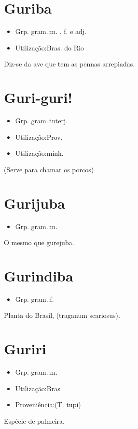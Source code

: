 \section{Guriba}
\begin{itemize}
\item {Grp. gram.:m. ,  f.  e  adj.}
\end{itemize}
\begin{itemize}
\item {Utilização:Bras. do Rio}
\end{itemize}
Diz-se da ave que tem as pennas arrepiadas.
\section{Guri-guri!}
\begin{itemize}
\item {Grp. gram.:interj.}
\end{itemize}
\begin{itemize}
\item {Utilização:Prov.}
\end{itemize}
\begin{itemize}
\item {Utilização:minh.}
\end{itemize}
(Serve para chamar os porcos)
\section{Gurijuba}
\begin{itemize}
\item {Grp. gram.:m.}
\end{itemize}
O mesmo que \textunderscore gurejuba\textunderscore .
\section{Gurindiba}
\begin{itemize}
\item {Grp. gram.:f.}
\end{itemize}
Planta do Brasil, (\textunderscore traganum scariosus\textunderscore ).
\section{Guriri}
\begin{itemize}
\item {Grp. gram.:m.}
\end{itemize}
\begin{itemize}
\item {Utilização:Bras}
\end{itemize}
\begin{itemize}
\item {Proveniência:(T. tupi)}
\end{itemize}
Espécie de palmeira.

